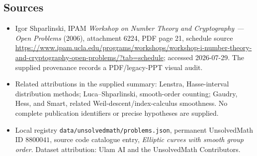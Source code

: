 \documentclass[11pt]{article}
\begin{document}
\subsection{Sources}
\begin{itemize}
\item Igor Shparlinski, IPAM \emph{Workshop on Number Theory and Cryptography --- Open Problems} (2006), attachment 6224, PDF page 21, schedule source \url{https://www.ipam.ucla.edu/programs/workshops/workshop-i-number-theory-and-cryptography-open-problems/?tab=schedule}; accessed 2026-07-29. The supplied provenance records a PDF/legacy-PPT visual audit.
\item Related attributions in the supplied summary: Lenstra, Hasse-interval distribution methods; Luca--Shparlinski, smooth-order counting; Gaudry, Hess, and Smart, related Weil-descent/index-calculus smoothness. No complete publication identifiers or precise hypotheses are supplied.
\item Local registry \texttt{data/unsolvedmath/problems.json}, permanent UnsolvedMath ID $8800041$, source code catalogue entry, \emph{Elliptic curves with smooth group order}. Dataset attribution: Ulam AI and the UnsolvedMath Contributors.
\end{itemize}
\end{document}
